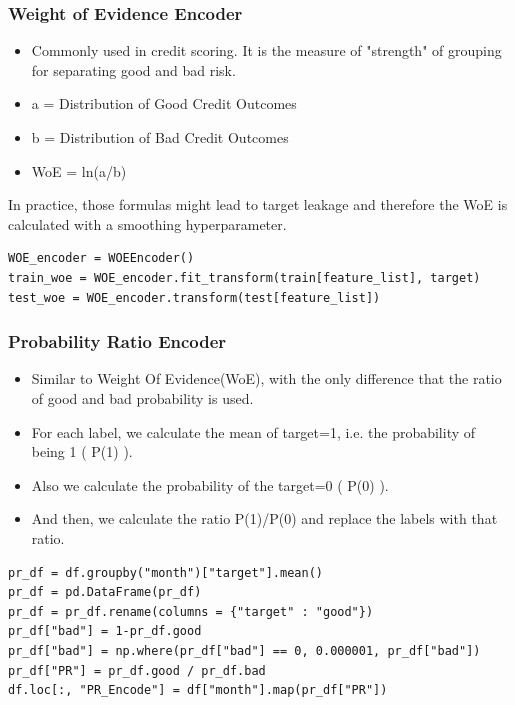 \documentclass{beamer}
\begin{document}
    \begin{frame}[fragile]
        \frametitle{Weight of Evidence Encoder}
        \begin{itemize}
            \item Commonly used in credit scoring. It is the measure of "strength" of grouping
            for separating good and bad risk.
            \pause
            \item a = Distribution of Good Credit Outcomes
            \item b = Distribution of Bad Credit Outcomes
            \item WoE = ln(a/b)
            \pause
        \end{itemize}

        In practice, those formulas might lead to target leakage and therefore the WoE is
        calculated with a smoothing hyperparameter.

        \begin{lstlisting}
WOE_encoder = WOEEncoder()
train_woe = WOE_encoder.fit_transform(train[feature_list], target)
test_woe = WOE_encoder.transform(test[feature_list])
        \end{lstlisting}
    \end{frame}

    \begin{frame}[fragile]
        \frametitle{Probability Ratio Encoder}
        \begin{itemize}
            \item Similar to Weight Of Evidence(WoE), with the only difference that the ratio of
            good and bad probability is used.
            \pause
            \item For each label, we calculate the mean of target=1, i.e. the probability of
            being 1 ( P(1) ).
            \pause
            \item Also we calculate the probability of the target=0 ( P(0) ).
            \pause
            \item And then, we calculate the ratio P(1)/P(0) and replace the labels with that ratio.
            \pause
        \end{itemize}

        \begin{lstlisting}
pr_df = df.groupby("month")["target"].mean()
pr_df = pd.DataFrame(pr_df)
pr_df = pr_df.rename(columns = {"target" : "good"})
pr_df["bad"] = 1-pr_df.good
pr_df["bad"] = np.where(pr_df["bad"] == 0, 0.000001, pr_df["bad"])
pr_df["PR"] = pr_df.good / pr_df.bad
df.loc[:, "PR_Encode"] = df["month"].map(pr_df["PR"])
        \end{lstlisting}
    \end{frame}
\end{document}
